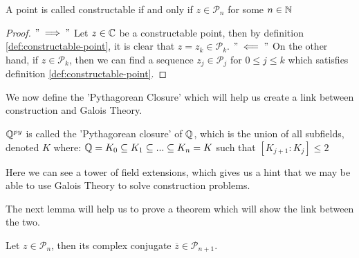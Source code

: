 \begin{theorem}
    A point is called constructable if and only if $z\in \mathcal{P}_n$ for some $n\in \mathbb N$
\end{theorem}

\begin{proof}  
    $"\implies"$ Let $z \in \mathbb C$ be a constructable point, then by definition \ref{def:constructable-point}, it is clear that $z=z_k\in \mathcal{P}_k$.
    $"\impliedby"$ On the other hand, if $z \in \mathcal{P}_k$, then we can find a sequence $z_j \in \mathcal{P}_j$ for $0\leq j \leq k$ which satisfies definition \ref{def:constructable-point}.
\end{proof}

We now define the 'Pythagorean Closure' which will help us create a link between construction and Galois Theory.

\begin{definition}
    $\mathbb Q^{py}$ is called the 'Pythagorean closure' of $\mathbb Q$, which is the union of all subfields, denoted $K$ where:
    $\mathbb Q = K_0 \subseteq K_1 \subseteq ... \subseteq K_n=K$ such that $[K_{j+1}:K_j]\leq 2$
\end{definition}

Here we can see a tower of field extensions, which gives us a hint that we may be able to use Galois Theory to solve construction problems.

The next lemma will help us to prove a theorem which will show the link between the two.

\begin{lemma}\label{lemma:conjugate-in-Pn}
    Let $z \in \mathcal{P}_n$, then its complex conjugate $\overline{z} \in \mathcal{P}_{n+1}$.
\end{lemma}

